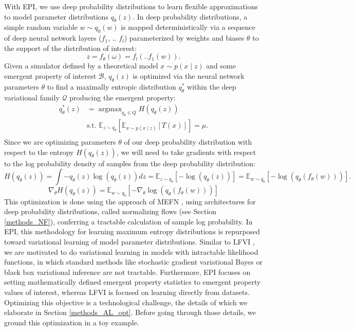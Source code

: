 \documentclass[11pt]{article}
\DeclareMathOperator*{\argmax}{argmax}
\begin{document}
With EPI, we use deep probability distributions to learn flexible approximations to model parameter distributions $q_\theta(z)$.
 In deep probability distributions, a simple random variable $w \sim q_0(w)$ is mapped deterministically via a sequence of deep neural network layers ($f_1$, .. $f_l$) parameterized by weights and biases $\theta$ to the support of the distribution of interest:
\begin{equation}
z = f_{\theta}(\omega) = f_l(..f_1(w)).
\end{equation}
Given a simulator defined by a theoretical model $x \sim p(x \mid z)$ and some emergent property of interest $\mathcal{B}$, $q_\theta(z)$ is optimized via the neural network parameters $\theta$ to find a maximally entropic distribution $q_{\theta}^*$ within the deep variational family $\mathcal{Q}$ producing the emergent property:
\begin{equation} \label{eq:opt}
\begin{split}
q_\theta^*(z) &= \argmax_{q_\theta \in Q} H(q_\theta(z)) \\
 &  \text{s.t.  } \mathbb{E}_{z \sim q_\theta}\left[ \mathbb{E}_{x\sim p(x \mid z)}\left[T(x)\right] \right] = \mu. \\
 \end{split}
\end{equation} 
Since we are optimizing parameters $\theta$ of our deep probability distribution with respect to the entropy $H(q_\theta(z))$, we will need to take gradients with respect to the log probability density of samples from the deep probability distribution:
\begin{equation}
H(q_\theta(z)) = \int - q_\theta(z) \log(q_\theta(z)) dz = \mathbb{E}_{z \sim q_\theta}\left[-\log(q_\theta(z)) \right] = \mathbb{E}_{w \sim q_0}\left[-\log(q_\theta(f_\theta(w))) \right].
\end{equation}
\begin{equation}
\nabla_\theta H(q_\theta(z)) = \mathbb{E}_{w \sim q_0}\left[- \nabla_\theta \log(q_\theta(f_\theta(w))) \right]
\end{equation}
This optimization is done using the approach of MEFN \cite{loaiza2017maximum}, using architectures for deep probability distributions, called normalizing flows (see Section \ref{methods_NF}), conferring a tractable calculation of sample log probability.  In EPI, this methodology for learning maximum entropy distributions is repurposed toward variational learning of model parameter distributions.  
Similar to LFVI \cite{tran2017hierarchical}, we are motivated to do variational learning in models with intractable likelihood functions, in which standard methods like stochastic gradient variational Bayes \cite{kingma2013auto} or black box variational inference \cite{ranganath2014black} are not tractable.  Furthermore, EPI focuses on setting mathematically defined emergent property statistics to emergent property values of interest, whereas LFVI is focused on learning directly from datasets.  Optimizing this objective is a technological challenge, the details of which we elaborate in Section \ref{methods_AL_opt}.  Before going through those details, we ground this optimization in a toy example.
\end{document}
